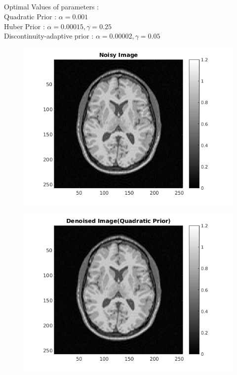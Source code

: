 \documentclass[11pt]{article}
\begin{document}
\maketitle

\subsection{}
Optimal Values of parameters : \\
Quadratic Prior : $\alpha = 0.001$ \\
Huber Prior : $\alpha = 0.00015, \gamma = 0.25$ \\
Discontinuity-adaptive prior : $\alpha = 0.00002, \gamma = 0.05$

\begin{figure}[h]
\centering
\includegraphics[scale=0.7]{Noisy}
\end{figure}

\begin{figure}[h]
\centering
\includegraphics[scale=0.7]{DenoisedQuad}
\end{figure}
\end{document}
